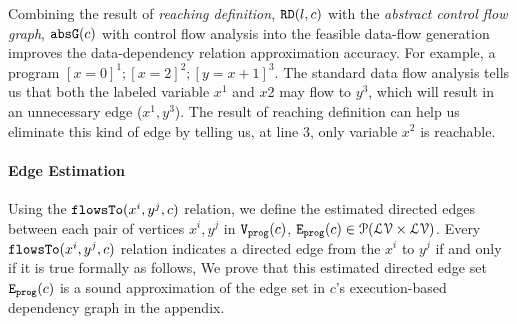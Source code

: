 Combining the result of \emph{reaching definition}, $\mathtt{RD}(l, c)$
with the \emph{abstract control flow graph}, $\mathtt{abs}{\mathtt{G}}(c)$ with control flow analysis into the feasible 
data-flow generation improves the data-dependency relation approximation accuracy. 
For example, a program $ [x = 0]^{1}; [x=2]^{2};  [y = x+1]^{3}$. 
The standard data flow analysis 
tells us that both the labeled variable $x^{1}$ and $x${2} may flow to $y^{3}$, which will result in an unnecessary edge ($x^{1}, y^{3}$). The result of reaching definition 
can help us eliminate this kind of edge by telling us, at line $3$, only variable $x^{2}$ is reachable. 
\paragraph{Edge Estimation}
Using the $\mathtt{flowsTo}(x^i, y^j, c)$ relation, we define the estimated directed edges
between each pair of vertices $x^i, y^j$ in $\mathtt{{V_{prog}}}(c)$,
$\mathtt{{E_{prog}}}(c) \in \mathcal{P}( \mathcal{LV} \times \mathcal{LV})$.
Every $\mathtt{flowsTo}(x^i, y^j, c)$ relation indicates a directed edge from the $x^i$ to $y^j$ if and only if it is true
formally as follows,
We prove that this estimated directed edge set $\mathtt{{E_{prog}}}(c)$ is a sound approximation of the 
edge set in $c$'s execution-based dependency graph 
in the appendix.
